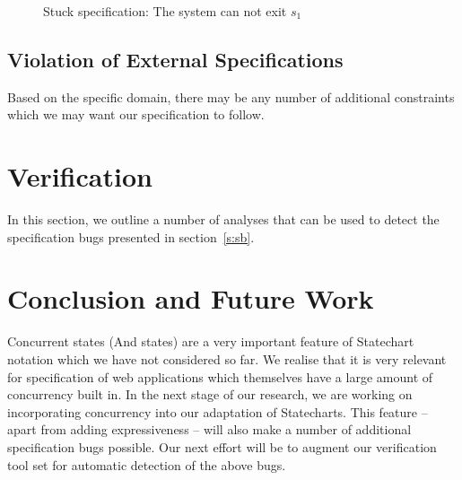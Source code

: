 \documentclass[12pt,a4paper]{article}
\begin{document}
\begin{figure}[H]

\caption{Stuck specification: The system can not exit $s_1$}
\label{f:stuck}
\end{figure}

\subsection{Violation of External Specifications}
Based on the specific domain, there may be any number of additional constraints which we may want our specification to follow. 


\section{Verification} \label{s:ver}
In this section, we outline a number of analyses that can be used to detect the specification bugs presented in section~\ref{s:sb}.

\section{Conclusion and Future Work}


Concurrent states (And states) are a very important feature of Statechart notation which we have not considered so far. We realise that it is very relevant for specification of web applications which themselves have a large amount of concurrency built in. In the next stage of our research, we are working on incorporating concurrency into our adaptation of Statecharts. This feature -- apart from adding expressiveness -- will also make a number of additional specification bugs possible. Our next effort will be to augment our verification tool set for automatic detection of the above bugs.
\end{document}
